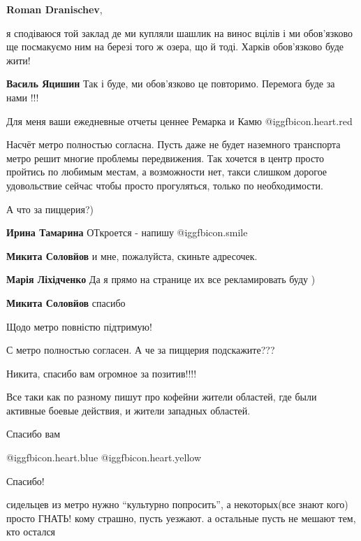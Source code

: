 \begin{itemize}
\textbf{Roman Dranischev}, 

я сподіваюся той заклад де ми купляли шашлик на винос вцілів і ми обов'язково
ще посмакуємо ним на березі того ж озера, що й тоді. Харків обов'язково буде
жити!

\textbf{Василь Яцишин} Так і буде, ми обов'язково це повторимо. Перемога буде за нами !!!

Для меня ваши ежедневные отчеты ценнее Ремарка и Камю @igg{fbicon.heart.red}


Насчёт метро полностью согласна. Пусть даже не будет наземного транспорта метро
решит многие проблемы передвижения. Так хочется в центр просто пройтись по
любимым местам, а возможности нет, такси слишком дорогое удовольствие сейчас
чтобы просто прогуляться, только по необходимости.

А что за пиццерия?)

\begin{itemize} %
\textbf{Ирина Тамарина} ОТкроется - напишу  @igg{fbicon.smile} 

\textbf{Микита Соловйов} и мне, пожалуйста, скиньте адресочек.

\textbf{Марія Ліхідченко} Да я прямо на странице их все рекламировать буду )

\textbf{Микита Соловйов} спасибо
\end{itemize} %

Щодо метро повністю підтримую!

С метро полностью согласен. А че за пиццерия подскажите???

Никита, спасибо вам огромное за позитив!!!!


Все таки как по разному пишут про кофейни жители областей, где были активные
боевые действия, и жители западных областей.

Спасибо вам

 @igg{fbicon.heart.blue}  @igg{fbicon.heart.yellow} 

Спасибо!


сидельцев из метро нужно \enquote{культурно попросить}, а некоторых(все знают кого)
просто ГНАТЬ! кому страшно, пусть уезжают. а остальные пусть не мешают тем, кто
остался


\end{itemize}
